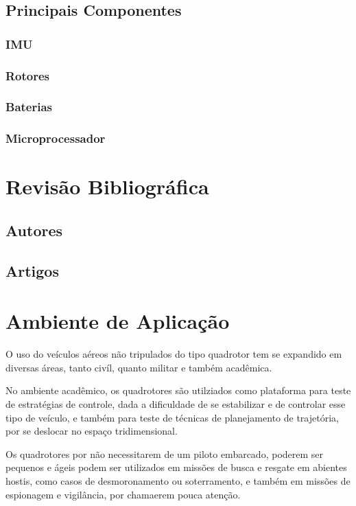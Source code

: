 \subsection{Principais Componentes}
\subsubsection{IMU}
\subsubsection{Rotores}
\subsubsection{Baterias}
\subsubsection{Microprocessador}

\section{Revisão Bibliográfica}
\subsection{Autores}
\subsection{Artigos}

\section{Ambiente de Aplicação}
O uso do veículos aéreos não tripulados do tipo quadrotor tem se expandido em diversas áreas, tanto civíl, quanto militar e também acadêmica.

No ambiente acadêmico, os quadrotores são utilziados como plataforma para teste de estratégias de controle, dada a dificuldade de se estabilizar e de controlar esse tipo de veículo, e também para teste de técnicas de planejamento de trajetória, por se deslocar no espaço tridimensional.

Os quadrotores por não necessitarem de um piloto embarcado, poderem ser pequenos e ágeis podem ser utilizados em missões de busca e resgate em abientes hostis, como casos de desmoronamento ou soterramento, e também em missões de espionagem e vigilância, por chamaerem pouca atenção.


